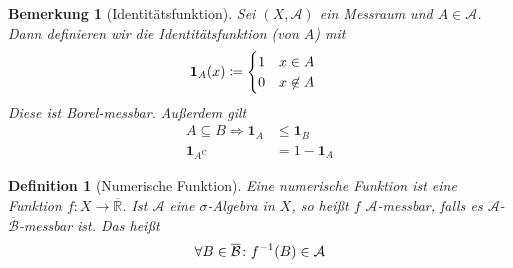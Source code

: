 \documentclass[11pt, twoside, a4paper]{article}
\theoremstyle{plain}
\newtheorem{bemerkung}[blockelement]{Bemerkung}
\newtheorem{definition}[blockelement]{Definition}
\numberwithin{equation}{subsection}
\newcommand{\pair}[1]{\left(#1\right)}
\newcommand{\of}[1]{\mathopen{}\mathclose{}\bgroup\left(#1\aftergroup\egroup\right)}
\newcommand{\impl}[0]{\Rightarrow{}}
\newcommand{\comp}[1]{{#1}^{\mathrm{C}}}
\newcommand{\R}{\mathbb{R}}
\newcommand{\mA}{\mathcal{A}}
\newcommand{\mB}{\mathcal{B}}
\begin{document}
    \begin{bemerkung}[Identitätsfunktion]
        Sei $\pair{X, \mA}$ ein Messraum und $A \in\mA$. Dann definieren wir die Identitätsfunktion (von $A$) mit
        \begin{align*}
            \mathbf{1}_A\of{x} &\coloneqq \begin{cases}
                                              1 &x\in A\\
                                              0 &x\not\in A
            \end{cases}
        \end{align*}
        Diese ist Borel-messbar. Außerdem gilt
        \begin{align*}
            A\subseteq B \impl \mathbf{1}_A &\leq \mathbf{1}_B\\
            \mathbf{1}_{\comp{A}} &= 1 - \mathbf{1}_A
        \end{align*}
    \end{bemerkung}

    \begin{definition}[Numerische Funktion]
        Eine numerische Funktion ist eine Funktion $f: X\to\overline{\R}$. Ist $\mA$ eine $\sigma$-Algebra in $X$, so heißt $f$ $\mA$-messbar, falls es $\mA$-$\overline{\mB}$-messbar ist. Das heißt
        \begin{align*}
            \forall B\in\overline{\mB}\colon f^{-1}\of{B} \in\mA
        \end{align*}
    \end{definition}
\end{document}
